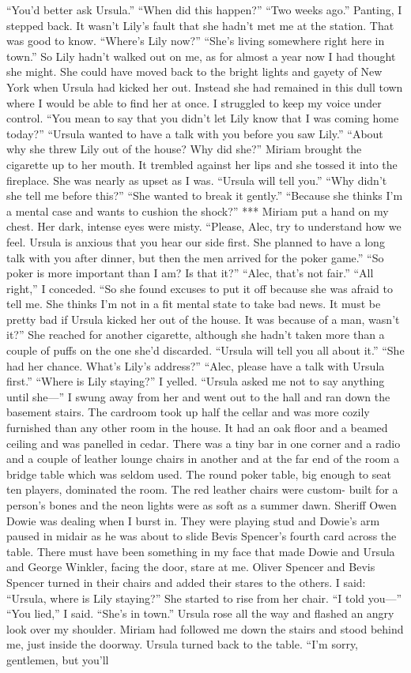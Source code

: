 \documentclass{novel}
\begin{document}
“You’d better ask Ursula.” “When did this happen?” “Two weeks ago.” Panting, I stepped back. It wasn’t Lily’s fault that she hadn’t met me at the station. That was good to know. “Where’s Lily now?” “She’s living somewhere right here in town.” So Lily hadn’t walked out on me, as for almost a year now I had thought she might. She could have moved back to the bright lights and gayety of New York when Ursula had kicked her out. Instead she had remained in this dull town where I would be able to find her at once. I struggled to keep my voice under control. “You mean to say that you didn’t let Lily know that I was coming home today?” “Ursula wanted to have a talk with you before you saw Lily.” “About why she threw Lily out of the house? Why did she?” Miriam brought the cigarette up to her mouth. It trembled against her lips and she tossed it into the fireplace. She was nearly as upset as I was. “Ursula will tell you.” “Why didn’t she tell me before this?” “She wanted to break it gently.” “Because she thinks I’m a mental case and wants to cushion the shock?” *** Miriam put a hand on my chest. Her dark, intense eyes were misty. “Please, Alec, try to understand how we feel. Ursula is anxious that you hear our side first. She planned to have a long talk with you after dinner, but then the men arrived for the poker game.” “So poker is more important than I am? Is that it?” “Alec, that’s not fair.” “All right,” I conceded. “So she found excuses to put it off because she was afraid to tell me. She thinks I’m not in a fit mental state to take bad news. It must be pretty bad if Ursula kicked her out of the house. It was because of a man, wasn’t it?” She reached for another cigarette, although she hadn’t taken more than a couple of puffs on the one she’d discarded. “Ursula will tell you all about it.” “She had her chance. What’s Lily’s address?” “Alec, please have a talk with Ursula first.” “Where is Lily staying?” I yelled. “Ursula asked me not to say anything until she—” I swung away from her and went out to the hall and ran down the basement stairs. The cardroom took up half the cellar and was more cozily furnished than any other room in the house. It had an oak floor and a beamed ceiling and was panelled in cedar. There was a tiny bar in one corner and a radio and a couple of leather lounge chairs in another and at the far end of the room a bridge table which was seldom used. The round poker table, big enough to seat ten players, dominated the room. The red leather chairs were custom- built for a person’s bones and the neon lights were as soft as a summer dawn. Sheriff Owen Dowie was dealing when I burst in. They were playing stud and Dowie’s arm paused in midair as he was about to slide Bevis Spencer’s fourth card across the table. There must have been something in my face that made Dowie and Ursula and George Winkler, facing the door, stare at me. Oliver Spencer and Bevis Spencer turned in their chairs and added their stares to the others. I said: “Ursula, where is Lily staying?” She started to rise from her chair. “I told you—” “You lied,” I said. “She’s in town.” Ursula rose all the way and flashed an angry look over my shoulder. Miriam had followed me down the stairs and stood behind me, just inside the doorway. Ursula turned back to the table. “I’m sorry, gentlemen, but you’ll 
\end{document}
